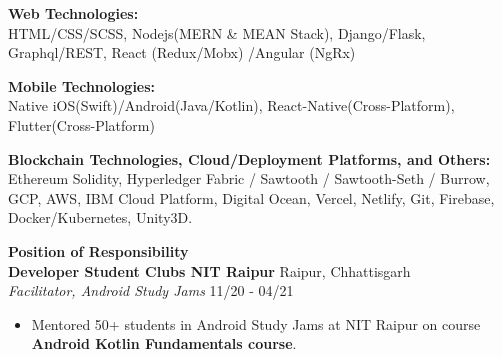 \documentclass{article}
\begin{document}
\noindent \normalsize \textbf{Web Technologies:} \\
\noindent \normalsize HTML/CSS/SCSS, Nodejs(MERN \& MEAN Stack), Django/Flask, Graphql/REST, React
(Redux/Mobx) /Angular (NgRx)
\vspace{5pt}

\noindent \normalsize \textbf{Mobile Technologies:} \\
\noindent \normalsize Native iOS(Swift)/Android(Java/Kotlin), React-Native(Cross-Platform), Flutter(Cross-Platform)
\vspace{5pt}

\noindent \normalsize \textbf{Blockchain Technologies, Cloud/Deployment Platforms, and Others:}\\
\noindent \normalsize Ethereum Solidity, Hyperledger Fabric / Sawtooth / Sawtooth-Seth / Burrow, GCP, AWS, IBM Cloud Platform, Digital Ocean, Vercel, Netlify, Git, Firebase, Docker/Kubernetes, Unity3D.

\vspace{10pt}
\noindent \large \textbf{\textcolor{NavyBlue}{Position of Responsibility}} \vspace{5pt} \\
\noindent \normalsize \textbf{Developer Student Clubs NIT Raipur} \hfill Raipur, Chhattisgarh \\
\noindent \normalsize \textit{Facilitator, Android Study Jams} \hfill 11/20 - 04/21
\begin{itemize}[noitemsep,nolistsep,leftmargin=*]
    \item {Mentored 50+ students in Android Study Jams at NIT Raipur on course \textbf{Android Kotlin Fundamentals course}.}
\end{itemize}
\end{document}
